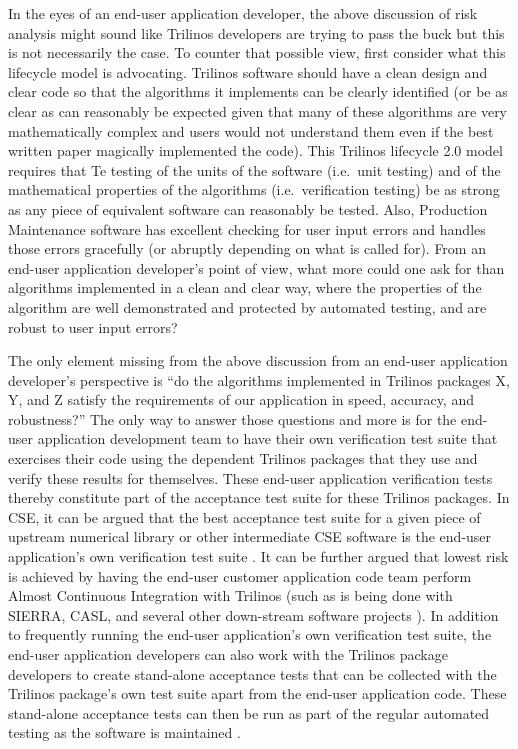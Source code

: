 \documentclass[11pt]{SANDreport}
\begin{document}
In the eyes of an end-user application developer, the above discussion
of risk analysis might sound like Trilinos developers are trying to
pass the buck but this is not necessarily the case.  To counter that
possible view, first consider what this lifecycle model is advocating.
Trilinos software should have a clean design and clear code so that
the algorithms it implements can be clearly identified (or be as clear
as can reasonably be expected given that many of these algorithms are
very mathematically complex and users would not understand them even
if the best written paper magically implemented the code).  This
Trilinos lifecycle 2.0 model requires that Te testing of the units of
the software (i.e.\ unit testing) and of the mathematical properties
of the algorithms (i.e.\ verification testing) be as strong as any
piece of equivalent software can reasonably be tested.  Also,
Production Maintenance software has excellent checking for user input
errors and handles those errors gracefully (or abruptly depending on
what is called for).  From an end-user application developer's point
of view, what more could one ask for than algorithms implemented in a
clean and clear way, where the properties of the algorithm are well
demonstrated and protected by automated testing, and are robust to
user input errors?

The only element missing from the above discussion from an end-user
application developer's perspective is ``do the algorithms implemented
in Trilinos packages X, Y, and Z satisfy the requirements of our
application in speed, accuracy, and robustness?''  The only way to
answer those questions and more is for the end-user application
development team to have their own verification test suite that
exercises their code using the dependent Trilinos packages that they
use and verify these results for themselves.  These end-user
application verification tests thereby constitute part of the
acceptance test suite for these Trilinos packages.  In CSE, it can be
argued that the best acceptance test suite for a given piece of
upstream numerical library or other intermediate CSE software is the
end-user application's own verification test suite
{}\cite{SoftwareIntegrationforCSE09}.  It can be further argued that
lowest risk is achieved by having the end-user customer application
code team perform Almost Continuous Integration with Trilinos (such as
is being done with SIERRA, CASL, and several other down-stream
software projects {}\cite{SoftwareIntegrationforCSE09}).  In addition
to frequently running the end-user application's own verification test
suite, the end-user application developers can also work with the
Trilinos package developers to create stand-alone acceptance tests
that can be collected with the Trilinos package's own test suite apart
from the end-user application code.  These stand-alone acceptance
tests can then be run as part of the regular automated testing as the
software is maintained {}\cite{DomainDrivenDesign}.
\end{document}
